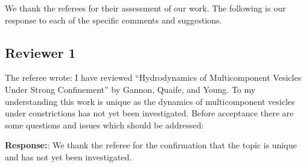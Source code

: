 \documentclass[11pt]{article}
\begin{document}
We thank the referees for their assessment of our work.  The following
is our response to each of the specific comments and suggestions.

\subsection*{Reviewer 1}

The referee wrote: I have reviewed ``Hydrodynamics of Multicomponent
Vesicles Under Strong Confinement'' by Gannon, Quaife, and Young. To my
understanding this work is unique as the dynamics of multicomponent
vesicles under constrictions has not yet been investigated. Before
acceptance there are some questions and issues which should be
addressed:
 
\noindent
{\bf Response:}: We thank the referee for the confirmation that the
topic is unique and has not yet been investigated.
\end{document}
